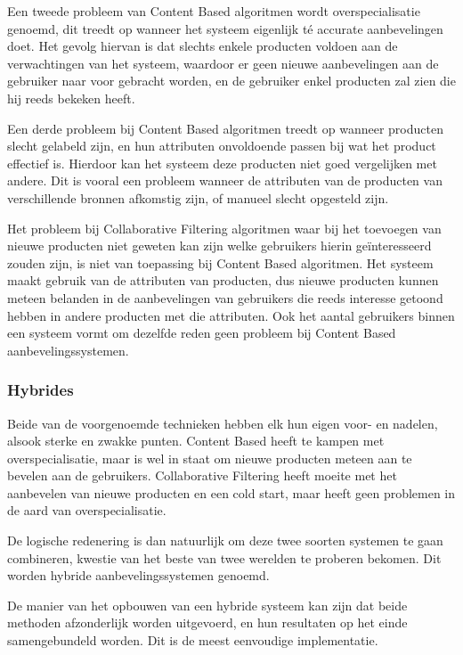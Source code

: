 Een tweede probleem van Content Based algoritmen wordt overspecialisatie genoemd, dit treedt op wanneer het systeem eigenlijk té accurate aanbevelingen doet. Het gevolg hiervan is dat slechts enkele producten voldoen aan de verwachtingen van het systeem, waardoor er geen nieuwe aanbevelingen aan de gebruiker naar voor gebracht worden, en de gebruiker enkel producten zal zien die hij reeds bekeken heeft. 

Een derde probleem bij Content Based algoritmen treedt op wanneer producten slecht gelabeld zijn, en hun attributen onvoldoende passen bij wat het product effectief is. Hierdoor kan het systeem deze producten niet goed vergelijken met andere. Dit is vooral een probleem wanneer de attributen van de producten van verschillende bronnen afkomstig zijn, of manueel slecht opgesteld zijn.

Het probleem bij Collaborative Filtering algoritmen waar bij het toevoegen van nieuwe producten niet geweten kan zijn welke gebruikers hierin geïnteresseerd zouden zijn, is niet van toepassing bij Content Based algoritmen. Het systeem maakt gebruik van de attributen van producten, dus nieuwe producten kunnen meteen belanden in de aanbevelingen van gebruikers die reeds interesse getoond hebben in andere producten met die attributen. Ook het aantal gebruikers binnen een systeem vormt om dezelfde reden geen probleem bij Content Based aanbevelingssystemen. 


\subsubsection{Hybrides}
\label{sec:Hybrides}

Beide van de voorgenoemde technieken hebben elk hun eigen voor- en nadelen, alsook sterke en zwakke punten. Content Based heeft te kampen met overspecialisatie, maar is wel in staat om nieuwe producten meteen aan te bevelen aan de gebruikers. Collaborative Filtering heeft moeite met het aanbevelen van nieuwe producten en een cold start, maar heeft geen problemen in de aard van overspecialisatie.

De logische redenering is dan natuurlijk om deze twee soorten systemen te gaan combineren, kwestie van het beste van twee werelden te proberen bekomen. Dit worden hybride aanbevelingssystemen \autocite{Cano2017} genoemd.

De manier van het opbouwen van een hybride systeem kan zijn dat beide methoden afzonderlijk worden uitgevoerd, en hun resultaten op het einde samengebundeld worden. Dit is de meest eenvoudige implementatie.

